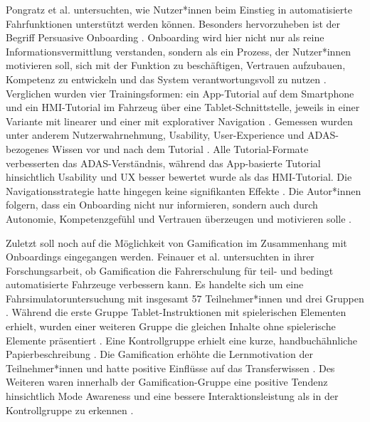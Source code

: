 Pongratz et al. \cite{pongratz2026persuasive} untersuchten, wie Nutzer*innen beim Einstieg in automatisierte Fahrfunktionen unterstützt werden können. Besonders hervorzuheben ist der Begriff Persuasive Onboarding \cite{pongratz2026persuasive}. Onboarding wird hier nicht nur als reine Informationsvermittlung verstanden, sondern als ein Prozess, der Nutzer*innen motivieren soll, sich mit der Funktion zu beschäftigen, Vertrauen aufzubauen, Kompetenz zu entwickeln und das System verantwortungsvoll zu nutzen \cite{pongratz2026persuasive}. Verglichen wurden vier Trainingsformen: ein App-Tutorial auf dem Smartphone und ein HMI-Tutorial im Fahrzeug über eine Tablet-Schnittstelle, jeweils in einer Variante mit linearer und einer mit explorativer Navigation \cite{pongratz2026persuasive}. Gemessen wurden unter anderem Nutzerwahrnehmung, Usability, User-Experience und ADAS-bezogenes Wissen vor und nach dem Tutorial \cite{pongratz2026persuasive}. Alle Tutorial-Formate verbesserten das ADAS-Verständnis, während das App-basierte Tutorial hinsichtlich Usability und UX besser bewertet wurde als das HMI-Tutorial. Die Navigationsstrategie hatte hingegen keine signifikanten Effekte \cite{pongratz2026persuasive}. Die Autor*innen folgern, dass ein Onboarding nicht nur informieren, sondern auch durch Autonomie, Kompetenzgefühl und Vertrauen überzeugen und motivieren solle \cite{pongratz2026persuasive}.

Zuletzt soll noch auf die Möglichkeit von Gamification im Zusammenhang mit Onboardings eingegangen werden. Feinauer et al. \cite{feinauer2022potential} untersuchten in ihrer Forschungsarbeit, ob Gamification die Fahrerschulung für teil- und bedingt automatisierte Fahrzeuge verbessern kann. Es handelte sich um eine Fahrsimulatoruntersuchung mit insgesamt 57 Teilnehmer*innen und drei Gruppen \cite{feinauer2022potential}. Während die erste Gruppe Tablet-Instruktionen mit spielerischen Elementen erhielt, wurden einer weiteren Gruppe die gleichen Inhalte ohne spielerische Elemente präsentiert \cite{feinauer2022potential}. Eine Kontrollgruppe erhielt eine kurze, handbuchähnliche Papierbeschreibung \cite{feinauer2022potential}. Die Gamification erhöhte die Lernmotivation der Teilnehmer*innen und hatte positive Einflüsse auf das Transferwissen \cite{feinauer2022potential}. Des Weiteren waren innerhalb der Gamification-Gruppe eine positive Tendenz hinsichtlich Mode Awareness und eine bessere Interaktionsleistung als in der Kontrollgruppe zu erkennen \cite{feinauer2022potential}.


